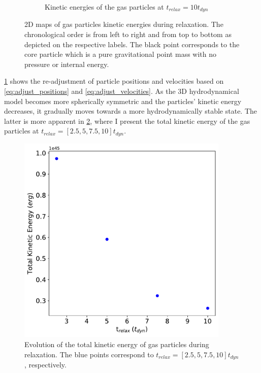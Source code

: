 \begin{figure}[H]
\begin{subfigure}[b]{0.49\textwidth}
        \caption[]%
        {{\small Kinetic energies of the gas particles at  $t_{relax} = 10t_{dyn}$}}
    \end{subfigure}
    \caption{2D maps of gas particles kinetic energies during relaxation.
    The chronological order is from left to right and from top to bottom as depicted on the respective labels. The black point corresponds to the core particle which is a pure gravitational point mass with no pressure or internal energy.}
    \label{fig:kin_energy_maps_relaxation}
\end{figure}
\cref{fig:kin_energy_maps_relaxation} shows the re-adjustment of particle positions and velocities based on \cref{eq:adjust_positions} and \cref{eq:adjust_velocities}. As the 3D hydrodynamical model becomes more spherically symmetric and the particles' kinetic energy decreases, it gradually moves towards a more hydrodynamically stable state. The latter is more apparent in \cref{fig:total_kin_energy_relaxation}, where
I present the total kinetic energy of the gas particles at $t_{relax} =[2.5, 5, 7.5, 10] t_{dyn}$.
\begin{figure}[H]
    \centering
    \includegraphics[width=0.9\textwidth]{Thesis/graphs/total_kientic_energy_during_relaxation.pdf}
    \caption{Evolution of the total kinetic energy of gas particles during relaxation. The blue points correspond to $t_{relax} =[2.5, 5, 7.5, 10] t_{dyn}$, respectively.}
    \label{fig:total_kin_energy_relaxation}
\end{figure}















